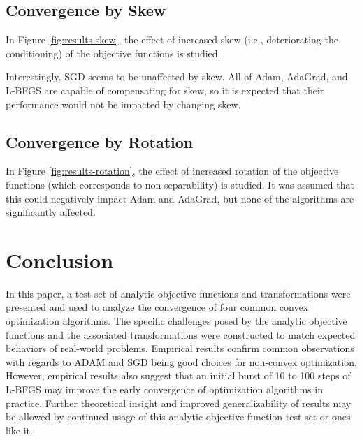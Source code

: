 \documentclass[letterpaper, 10 pt, conference]{IEEEtran}  %
\begin{document}
\subsection{Convergence by Skew}

In Figure \ref{fig:results-skew}, the effect of increased skew (i.e.,
deteriorating the conditioning) of the objective functions is studied.

Interestingly, SGD seems to be unaffected by skew. All of Adam,
AdaGrad, and L-BFGS are capable of compensating for skew, so it is
expected that their performance would not be impacted by changing
skew.

\subsection{Convergence by Rotation}

In Figure \ref{fig:results-rotation}, the effect of increased rotation
of the objective functions (which corresponds to non-separability) is
studied.  It was assumed that this could negatively impact Adam and
AdaGrad, but none of the algorithms are significantly affected.

\section{Conclusion}

In this paper, a test set of analytic objective functions and
transformations were presented and used to analyze the convergence of
four common convex optimization algorithms. The specific challenges
posed by the analytic objective functions and the associated
transformations were constructed to match expected behaviors of
real-world problems.  Empirical results confirm common observations
with regards to ADAM and SGD being good choices for non-convex
optimization. However, empirical results also suggest that an initial
burst of 10 to 100 steps of L-BFGS may improve the early convergence
of optimization algorithms in practice. Further theoretical insight
and improved generalizability of results may be allowed by continued
usage of this analytic objective function test set or ones like it.

\balance



\end{document}

